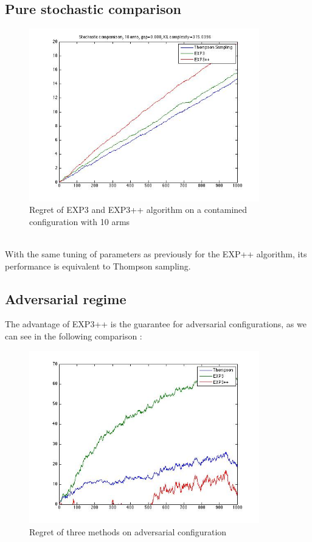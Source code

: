 \documentclass[11pt]{article}
\begin{document}
\subsection*{Pure stochastic comparison}
\begin{figure}[!h]
	\begin{minipage}[c]{0.5 \linewidth}
		\centering
		\captionsetup{justification=centering,margin=1cm}
		\includegraphics[width=10cm]{stochasticComparaison.jpg}
		\caption{Regret of EXP3 and EXP3++ algorithm on a contamined configuration with 10 arms}
	\end{minipage} \hfill
\end{figure}~\\
With the same tuning of parameters as previously for the EXP++ algorithm, its performance is equivalent to Thompson sampling.
\subsection*{Adversarial regime}
The advantage of EXP3++ is the guarantee for adversarial configurations, as we can see in the following comparison :
\begin{figure}[!h]
	\begin{minipage}[c]{0.5 \linewidth}
		\centering
		\captionsetup{justification=centering,margin=1cm}
		\includegraphics[width=10cm]{compAdversarial.jpg}
		\caption{Regret of three methods on adversarial configuration}
	\end{minipage} \hfill
\end{figure}~\\
\end{document}
